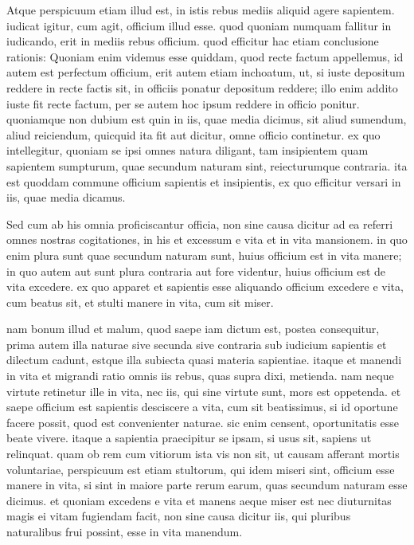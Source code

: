  Atque perspicuum etiam illud est, in istis rebus mediis aliquid agere sapientem. iudicat igitur, cum agit, officium illud esse. quod quoniam numquam fallitur in iudicando, erit in mediis rebus officium. quod efficitur hac etiam conclusione rationis: Quoniam enim videmus esse quiddam, quod recte factum appellemus, id autem est perfectum officium, erit autem etiam inchoatum, ut, si iuste depositum reddere in recte factis sit, in officiis ponatur depositum reddere; illo enim addito iuste fit recte factum, per se autem hoc ipsum reddere in officio ponitur. quoniamque non dubium est quin in iis, quae media dicimus, sit aliud sumendum, aliud reiciendum, quicquid ita fit aut dicitur, omne officio continetur. ex quo intellegitur, quoniam se ipsi omnes natura diligant, tam insipientem quam sapientem sumpturum, quae secundum naturam sint, reiecturumque contraria. ita est quoddam commune officium sapientis et insipientis, ex quo efficitur versari in iis, quae media dicamus.

 Sed cum ab his omnia proficiscantur officia, non sine causa dicitur ad ea referri omnes nostras cogitationes, in his et excessum e vita et in vita mansionem. in quo enim plura sunt quae secundum naturam sunt, huius officium est in vita manere; in quo autem aut sunt plura contraria aut fore videntur, huius officium est de vita excedere. ex quo apparet et sapientis esse aliquando officium excedere e vita, cum beatus sit, et stulti manere in vita, cum sit miser.

 nam bonum illud et malum, quod saepe iam dictum est, postea consequitur, prima autem illa naturae sive secunda sive contraria sub iudicium sapientis et dilectum cadunt, estque illa subiecta quasi materia sapientiae. itaque et manendi in vita et migrandi ratio omnis iis rebus, quas supra dixi, metienda. nam neque virtute retinetur ille in vita, nec iis, qui sine virtute sunt, mors est oppetenda. et saepe officium est sapientis desciscere a vita, cum sit beatissimus, si id oportune facere possit, quod est convenienter naturae. sic enim censent, oportunitatis esse beate vivere. itaque a sapientia praecipitur se ipsam, si usus sit, sapiens ut relinquat. quam ob rem cum vitiorum ista vis non sit, ut causam afferant mortis voluntariae, perspicuum est etiam stultorum, qui idem miseri sint, officium esse manere in vita, si sint in maiore parte rerum earum, quas secundum naturam esse dicimus. et quoniam excedens e vita et manens aeque miser est nec diuturnitas magis ei vitam fugiendam facit, non sine causa dicitur iis, qui pluribus naturalibus frui possint, esse in vita manendum.

